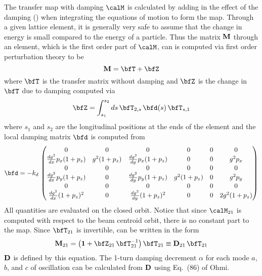 The transfer map with damping $\calM$ is calculated by adding in the effect of the damping
() when integrating the equations of motion to form the map. Through a given lattice
element, it is generally very safe to assume that the change in energy is small compared to the
energy of a particle. Thus the matrix ${\bf M}$ through an element, which is the first order part of
$\calM$, can is computed via first order perturbation theory to be
\begin{equation}
  \bfM = \bfT + \bfZ
  \label{mtz}
\end{equation}
where $\bfT$ is the transfer matrix without damping and $\bfZ$ is the change in $\bfT$ due
to damping computed via
\begin{equation}
  \bfZ = \int_{s_1}^{s_2} ds \, \bfT_{2,s} \, \bfd(s) \, \bfT_{s,1}
  \label{zstd}
\end{equation}
where $s_1$ and $s_2$ are the longitudinal positions at the ends of the element and
the local damping matrix $\bfd$ is computed from 
\begin{equation}
  \bfd = -k_d \, \begin{pmatrix}
    0                           & 0           & 0                           & 0           & 0 & 0       \\
    \frac{dg^2}{dx} p_x (1+p_z) & g^2 (1+p_z) & \frac{dg^2}{dy} p_x (1+p_z) & 0           & 0 & g^2 p_x \\
    0                           & 0           & 0                           & 0           & 0 & 0       \\
    \frac{dg^2}{dx} p_y (1+p_z) & 0           & \frac{dg^2}{dy} p_y (1+p_z) & g^2 (1+p_z) & 0 & g^2 p_y \\
    0                           & 0           & 0                           & 0           & 0 & 0       \\
    \frac{dg^2}{dx} (1+p_z)^2   & 0           & \frac{dg^2}{dy} (1+p_z)^2   & 0           & 0 & 2 g^2 (1+p_z) \\
  \end{pmatrix}
\end{equation}
All quantities are evaluated on the closed orbit. Notice that since $\calM_{21}$ is computed with
respect to the beam centroid orbit, there is no constant part to the map. Since $\bfT_{21}$ is
invertible,  can be written in the form
\begin{equation}
  \bfM_{21} = \bigl( \boldsymbol{1} + \bfZ_{21} \, \bfT_{21}^{-1} \bigr) \, \bfT_{21} 
  \equiv \bfD_{21} \, \bfT_{21} 
\end{equation}
${\bf D}$ is defined by this equation. The 1-turn damping decrement $\alpha$ for each mode $a$, $b$,
and $c$ of oscillation can be calculated from ${\bf D}$ using Eq.~(86) of Ohmi\cite{b:ohmi}.

